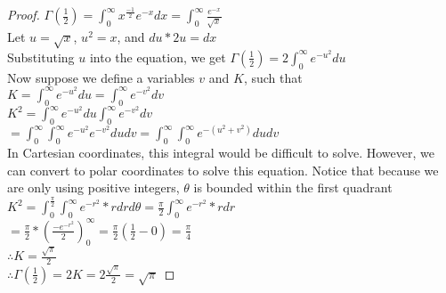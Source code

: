 \documentclass[11pt,twosided]{article}
\begin{document}
\begin{proof}
$\Gamma(\frac{1}{2})=\int_{0}^{\infty}{x^{\frac{-1}{2}}e^{-x}}dx = \int_{0}^{\infty}{\frac{e^{-x}}{\sqrt{x}}}$\\
Let $u=\sqrt{x}$, $u^2=x$, and $du*2u=dx$\\
Substituting $u$ into the equation, we get $\Gamma(\frac{1}{2})=2\int_{0}^{\infty}{e^{-u^2}}du$\\
Now suppose we define a variables $v$ and $K$, such that\\
$K=\int_{0}^{\infty}{e^{-u^2}}du = \int_{0}^{\infty}{e^{-v^2}}dv$\\
$K^2=\int_{0}^{\infty}{e^{-u^2}}du \int_{0}^{\infty}{e^{-v^2}}dv$\\
$=\int_{0}^{\infty}\int_{0}^{\infty}{e^{-u^2}e^{-v^2}}dudv = \int_{0}^{\infty}\int_{0}^{\infty}{e^{-(u^2+v^2)}}dudv$\\
In Cartesian coordinates, this integral would be difficult to solve. However, we can convert to polar coordinates to solve this equation. Notice that because we are only using positive integers, $\theta$ is bounded within the first quadrant\\
$K^2=\int_{0}^{\frac{\pi}{2}}\int_{0}^{\infty}{e^{-r^2}*r}drd\theta = \frac{\pi}{2}\int_{0}^{\infty}{e^{-r^2}*r}dr$\\
$=\frac{\pi}{2}*(\frac{-e^{-r^2}}{2})_{0}^{\infty} = \frac{\pi}{2}(\frac{1}{2} - 0) = \frac{\pi}{4}$\\
$\therefore K = \frac{\sqrt{\pi}}{2}$\\
$\therefore \Gamma(\frac{1}{2}) = 2K = 2\frac{\sqrt{\pi}}{2} = \sqrt{\pi}$
\end{proof}
\end{document}
